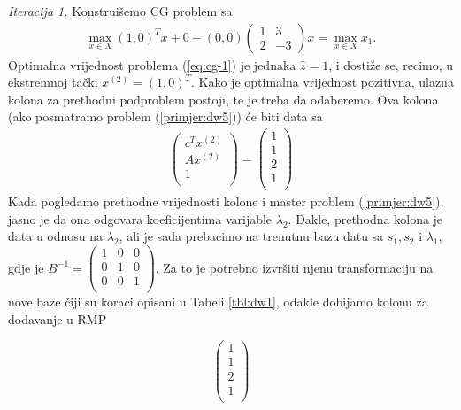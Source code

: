\documentclass[a4paper, utf8, 11pt, colorlinks]{book}
\theoremstyle{definition}
\begin{document}
\emph{Iteracija 1.} 
Konstruišemo CG problem sa
\begin{align}\label{eq:cg-1}
	 \max_{x \in X} (1, 0)^T x + 0 - (0, 0) \left(\begin{array}{cc}
	 	1 & 3 \\
	 	2 & -3
	 \end{array}\right)  x = \max_{x \in X} x_1. 
\end{align} 
Optimalna vrijednost problema (\ref{eq:cg-1}) je jednaka $\hat{z}=1$, i dostiže se, recimo, u ekstremnoj tački $ x^{(2)}= (1, 0)^T.$ Kako je optimalna vrijednost pozitivna, ulazna kolona za prethodni podproblem postoji, te je treba da odaberemo. Ova kolona (ako posmatramo problem (\ref{primjer:dw5})) će biti data sa 
\begin{align}
     \begin{pmatrix}
     	    c^T  x^{(2)} \\
     	    A x^{(2)}  \\
     	    1     \\
     \end{pmatrix} = \begin{pmatrix}
               1 \\
               1  \\
               2  \\
               1\\
 \end{pmatrix}
\end{align}
Kada pogledamo prethodne vrijednosti kolone i master problem (\ref{primjer:dw5}), jasno je da ona odgovara koeficijentima varijable $\lambda_2$. Dakle, prethodna kolona je data u odnosu na $\lambda_2$, ali je sada prebacimo na trenutnu bazu datu sa $s_1, s_2$ i $\lambda_1$, gdje je $B^{-1} =  \begin{pmatrix}
	1 & 0 & 0 \\
	0 & 1 & 0  \\
	0 & 0 & 1  \\
\end{pmatrix}. $ %
Za to je potrebno izvršiti njenu transformaciju na nove baze čiji su koraci opisani u Tabeli \ref{tbl:dw1}, odakle dobijamo kolonu za dodavanje u RMP


$$	\begin{pmatrix}
	       1 \\
	      1  \\
	      2  \\
	      1\\
	\end{pmatrix}
 $$
 
\end{document}
